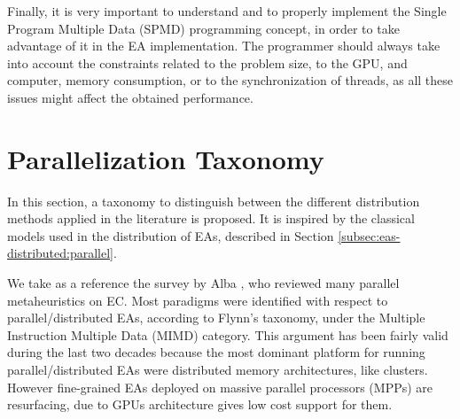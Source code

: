\documentclass{article}
\begin{document}
Finally, it is very important to understand and to properly implement
the Single Program Multiple Data (SPMD)\cite{SPMD-wikipedia} programming
concept, in order to take advantage of it in the EA implementation. The programmer should always take into account the constraints related to the problem size, to the GPU, and computer, memory consumption, or to the synchronization of threads, as all these issues might affect the obtained performance.


\section{Parallelization Taxonomy}
\label{sec:taxonomy}

In this section, a taxonomy to distinguish between the different
distribution methods applied in the literature is proposed.  
It is inspired by the classical models used in the distribution of EAs, described in Section \ref{subsec:eas-distributed:parallel}. 

We take as a reference the survey by Alba \cite{Alba2005book}, who reviewed many parallel metaheuristics on EC. Most paradigms were identified with respect to
parallel/distributed EAs, according to Flynn's taxonomy, under the
Multiple Instruction Multiple Data (MIMD) category. This argument has
been fairly valid during the last two decades because the most
dominant platform for running parallel/distributed EAs were
distributed memory architectures, like clusters. However fine-grained
EAs deployed on massive parallel processors (MPPs) are resurfacing,
due to GPUs architecture gives low cost support for them. 
\end{document}
